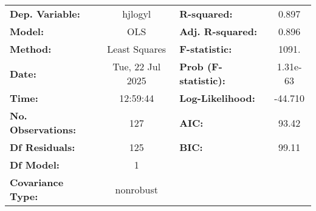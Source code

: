 \begin{center}
\begin{tabular}{lclc}
\toprule
\textbf{Dep. Variable:}    &     hjlogyl      & \textbf{  R-squared:         } &    0.897  \\
\textbf{Model:}            &       OLS        & \textbf{  Adj. R-squared:    } &    0.896  \\
\textbf{Method:}           &  Least Squares   & \textbf{  F-statistic:       } &    1091.  \\
\textbf{Date:}             & Tue, 22 Jul 2025 & \textbf{  Prob (F-statistic):} & 1.31e-63  \\
\textbf{Time:}             &     12:59:44     & \textbf{  Log-Likelihood:    } &  -44.710  \\
\textbf{No. Observations:} &         127      & \textbf{  AIC:               } &    93.42  \\
\textbf{Df Residuals:}     &         125      & \textbf{  BIC:               } &    99.11  \\
\textbf{Df Model:}         &           1      & \textbf{                     } &           \\
\textbf{Covariance Type:}  &    nonrobust     & \textbf{                     } &           \\
\bottomrule
\end{tabular}
\end{center}